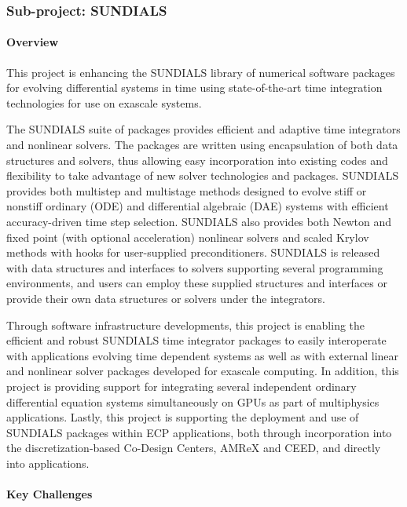 \subsubsection{ Sub-project: SUNDIALS}
\label{subsubsect:SUNDIALS-hypre}

\paragraph{Overview}

This project is enhancing the SUNDIALS library of numerical software packages
for evolving differential systems in time using state-of-the-art time
integration technologies for use on exascale systems.

The SUNDIALS suite of packages \cite{SUNDIALSweb} provides efficient and
adaptive time integrators and nonlinear solvers.  The packages are written using
encapsulation of both data structures and solvers, thus allowing easy
incorporation into existing codes and flexibility to take advantage of new
solver technologies and packages.  SUNDIALS provides both multistep and
multistage methods designed to evolve stiff or nonstiff ordinary (ODE) and
differential algebraic (DAE) systems with efficient accuracy-driven time step
selection.  SUNDIALS also provides both Newton and fixed point (with optional
acceleration) nonlinear solvers and scaled Krylov methods with hooks for
user-supplied preconditioners.  SUNDIALS is released with data structures and
interfaces to solvers supporting several programming environments, and users can
employ these supplied structures and interfaces or provide their own data
structures or solvers under the integrators.

Through software infrastructure developments, this project is enabling the
efficient and robust SUNDIALS time integrator packages to easily interoperate
with applications evolving time dependent systems as well as with external
linear and nonlinear solver packages developed for exascale computing.  In
addition, this project is providing support for integrating several independent
ordinary differential equation systems simultaneously on GPUs as part of
multiphysics applications.  Lastly, this project is supporting the deployment
and use of SUNDIALS packages within ECP applications, both through incorporation
into the discretization-based Co-Design Centers, AMReX and CEED, and directly
into applications.

\paragraph{Key Challenges}

